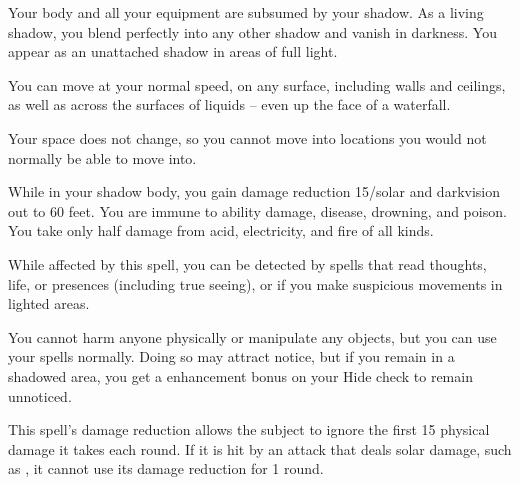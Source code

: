 \begin{spelleffect}
  Your body and all your equipment are subsumed by your shadow. As a living shadow, you blend perfectly into any other shadow and vanish in darkness. You appear as an unattached shadow in areas of full light.
  \par You can move at your normal speed, on any surface, including walls and ceilings, as well as across the surfaces of liquids -- even up the face of a waterfall.
  \par Your space does not change, so you cannot move into locations you would not normally be able to move into.
  \par While in your shadow body, you gain damage reduction 15/solar and darkvision out to 60 feet. You are immune to ability damage, disease, drowning, and poison. You take only half damage from acid, electricity, and fire of all kinds.
  \par While affected by this spell, you can be detected by spells that read thoughts, life, or presences (including true seeing), or if you make suspicious movements in lighted areas.
  \par You cannot harm anyone physically or manipulate any objects, but you can use your spells normally. Doing so may attract notice, but if you remain in a shadowed area, you get a  enhancement bonus on your Hide check to remain unnoticed.
\end{spelleffect}
\begin{spellnotes}
  This spell's damage reduction allows the subject to ignore the first 15 physical damage it takes each round. If it is hit by an attack that deals solar damage, such as , it cannot use its damage reduction for 1 round.
\end{spellnotes}

